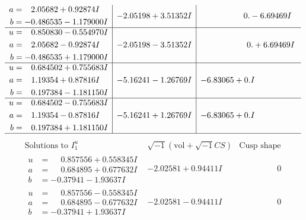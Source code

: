 \documentclass[1p]{elsarticle_modified}
\theoremstyle{definition}
\newcommand{\I}{\sqrt{-1}}
\begin{document}
$$\begin{array}{c|c|c}
\begin{aligned}
a &= \phantom{-}2.05682 + 0.92874 I \\
b &= -0.486535 - 1.179000 I\end{aligned}
 & -2.05198 + 3.51352 I & \phantom{-0.000000 } 0. - 6.69469 I \\ \hline\begin{aligned}
u &= \phantom{-}0.850830 - 0.554970 I \\
a &= \phantom{-}2.05682 - 0.92874 I \\
b &= -0.486535 + 1.179000 I\end{aligned}
 & -2.05198 - 3.51352 I & \phantom{-0.000000 -}0. + 6.69469 I \\ \hline\begin{aligned}
u &= \phantom{-}0.684502 + 0.755683 I \\
a &= \phantom{-}1.19354 + 0.87816 I \\
b &= \phantom{-}0.197384 - 1.181150 I\end{aligned}
 & -5.16241 - 1.26769 I & -6.83065 + 0. I\phantom{ +0.000000I} \\ \hline\begin{aligned}
u &= \phantom{-}0.684502 - 0.755683 I \\
a &= \phantom{-}1.19354 - 0.87816 I \\
b &= \phantom{-}0.197384 + 1.181150 I\end{aligned}
 & -5.16241 + 1.26769 I & -6.83065 + 0. I\phantom{ +0.000000I}\\
 \hline 
 \end{array}$$\newpage$$\begin{array}{c|c|c}  
\text{Solutions to }I^u_{1}& \I (\text{vol} + \sqrt{-1}CS) & \text{Cusp shape}\\
 \hline 
\begin{aligned}
u &= \phantom{-}0.857556 + 0.558345 I \\
a &= \phantom{-}0.684895 + 0.677632 I \\
b &= -0.37941 - 1.93637 I\end{aligned}
 & -2.02581 + 0.94411 I & \phantom{-0.000000 } 0 \\ \hline\begin{aligned}
u &= \phantom{-}0.857556 - 0.558345 I \\
a &= \phantom{-}0.684895 - 0.677632 I \\
b &= -0.37941 + 1.93637 I\end{aligned}
 & -2.02581 - 0.94411 I & \phantom{-0.000000 } 0 \\ \hline\begin{aligned}

\end{aligned}
\end{array}$$
\end{document}
